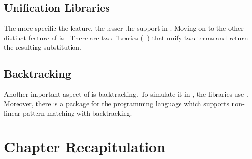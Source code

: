 \documentclass[thesis-solanki.tex]{subfiles}
\begin{document}
\subsection{Unification Libraries}

The more specific the feature, the lesser the support in .
Moving on to the other distinct feature of  is .
There are two libraries (\cite{unification-fd-lib}, \cite{cmu-lib}) that unify two  terms and return
the resulting substitution.


\subsection{Backtracking}

Another important aspect of  is backtracking.
To simulate it in , the libraries \cite{stream-monad-lib, logicst-lib} use .
Moreover, there is a package for the  programming language \cite{egison-lib} which supports
non-linear pattern-matching with backtracking.




\section{Chapter Recapitulation}


\ifMain
\begin{scope}
  \nolinenumbers
  \enotesize
  \par
  \begin{singlespace}
  \setlength{\parskip}{12pt plus 2pt minus 1pt}
  \theendnotes
  \par
  \end{singlespace}
\end{scope}
\fi
\end{document}
